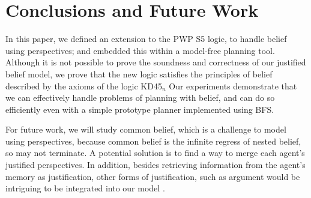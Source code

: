 \section{Conclusions and Future Work}

In this paper, we defined an extension to the PWP S5 logic, to handle belief using perspectives; and embedded this within a model-free planning tool. 
Although it is not possible to prove the soundness and correctness of our justified belief model, we prove that the new logic satisfies the principles of belief described by the axioms of the logic KD45$_n$
Our experiments demonstrate that we can effectively handle problems of planning with belief, and can do so efficiently even with a simple prototype planner implemented using BFS.

For future work, we will study common belief, which is a challenge to model using perspectives, because common belief is the infinite regress of nested belief, so may not terminate. 
A potential solution is to find a way to merge each agent's justified perspectives. 
In addition, besides retrieving information from the agent's memory as justification, other forms of justification, such as argument would be intriguing to be integrated into our model \cite{goldman1979justified}.